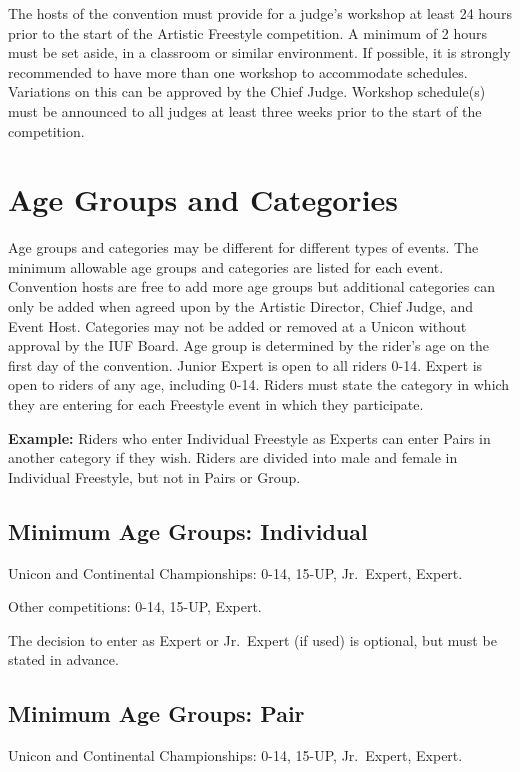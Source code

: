 The hosts of the convention must provide for a judge's workshop at least 24 hours prior to the start of the Artistic Freestyle competition.
A minimum of 2 hours must be set aside, in a classroom or similar environment.%
If possible, it is strongly recommended to have more than one workshop to accommodate schedules.%
Variations on this can be approved by the Chief Judge.
Workshop schedule(s) must be announced to all judges at least three weeks prior to the start of the competition.

\section{Age Groups and Categories}
\label{subsec:freestyle-age_groups_and_categories}
Age groups and categories may be different for different types of events.
The minimum allowable age groups and categories are listed for each event.
Convention hosts are free to add more age groups but additional categories can only be added when agreed upon by the Artistic Director, Chief Judge, and Event Host.
Categories may not be added or removed at a Unicon without approval by the IUF Board.
Age group is determined by the rider's age on the first day of the convention.
Junior Expert is open to all riders 0-14.
Expert is open to riders of any age, including 0-14.
Riders must state the category in which they are entering for each Freestyle event in which they participate.

\textbf{Example:} Riders who enter Individual Freestyle as Experts can enter Pairs in another category if they wish.
Riders are divided into male and female in Individual Freestyle, but not in Pairs or Group.

\subsection{Minimum Age Groups: Individual}
Unicon and Continental Championships: 0-14, 15-UP, Jr.~Expert, Expert.

Other competitions: 0-14, 15-UP, Expert.

The decision to enter as Expert or Jr.~Expert (if used) is optional, but must be stated in advance.

\subsection{Minimum Age Groups: Pair}
Unicon and Continental Championships: 0-14, 15-UP, Jr.~Expert, Expert.

